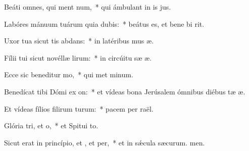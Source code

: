 \item Beáti omnes, qui ment num,~* qui ámbulant in is jus.
\item Labóres mánuum tuárum quia dubis:~* beátus es, et bene bi rit.
\item Uxor tua sicut tis abdans:~* in latéribus mus æ.
\item Fílii tui sicut novéllæ lirum:~* in circúitu sæ æ.
\item Ecce sic beneditur mo,~* qui met minum.
\item Benedícat tibi Dómi ex on:~* et vídeas bona Jerúsalem ómnibus diébus tæ æ.
\item Et vídeas fílios filirum turum:~* pacem per raël.
\item Glória tri, et o,~* et Spitui to.
\item Sicut erat in princípio, et , et per,~* et in sǽcula sæcurum. men.
